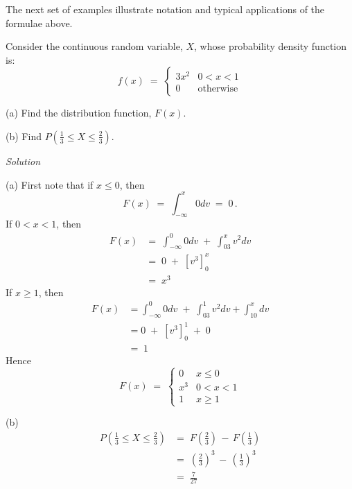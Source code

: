 The next set of examples illustrate notation and typical applications of the formulae above.

\begin{example}\label{EgPdf3xsqon01}
{Consider the continuous random variable, $X$, whose  probability density function is:
$$f(x)\;=\;\begin{cases}3x^2&0<x<1\\0&\textrm{otherwise}\end{cases}$$
 \be
\item[(a)]Find the distribution function, $F(x)$.
\item[(b)] Find $P(\frac{1}{3}\leq X\leq \frac{2}{3})$.
\ee
}

{\em Solution}\\[4pt]
\be

\item[(a)]First note that if $x\leq 0$, then  $$F(x)\;=\;\int^x_{-\infty}0dv\;=\;0\,.$$
If $0<x<1$, then
\begin{align*}F(x)&=\;\int^0_{-\infty}0dv\;+\;\int^x_03v^2dv\\[3pt]
&=\;0\;+\;\left[v^3\right]^x_0\\[3pt]
&=\;x^3\end{align*}
If $x\geq 1$, then
\begin{align*}F(x)&=\int^0_{-\infty}0dv\;+\;\int^1_03v^2dv+\int^x_10dv\\[3pt]
&=0\;+\;\left[v^3\right]^1_0\;+\;0\\[3pt]
&=\;1\end{align*}
Hence  $$F(x)\;=\;\begin{cases}0&x\leq 0\\x^3&0<x<1\\1&x\geq 1\end{cases}$$

\item[(b)]
\begin{align*}
P\left(\frac{1}{3} \leq X\leq\frac{2}{3}\right )
&=\; F\left(\frac{2}{3}\right) \,-\, F\left(\frac{1}{3}\right) \\[3pt]
&=\; \left(\frac{2}{3}\right)^3\,-\, \left(\frac{1}{3}\right)^3\\[3pt]
&=\;\frac{7}{27}
\end{align*}
\ee
\end{example}

